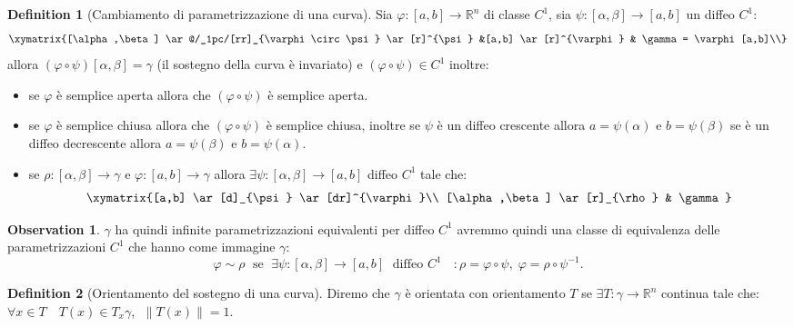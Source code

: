 \documentclass[leqno]{article}
\theoremstyle{definition}
\newtheorem{definition}{Definition}[section]
\numberwithin{equation}{section}
\newtheorem{observation}[theorem]{Observation}
\theoremstyle{remark}
\begin{document}
	\begin{definition}[Cambiamento di parametrizzazione di una curva]
		Sia $\varphi: [a,b] \to \mathbb{R}^n$ di classe $C^1$, sia $\psi : [\alpha,\beta] \to [a,b]$ un diffeo $C^1$:
		\begin{equation}
			\xymatrix{[\alpha,\beta] \ar@/_1pc/[rr]_{\varphi \circ \psi} 
				\ar[r]^{\psi}  &[a,b] \ar[r]^{\varphi} & \gamma = \varphi [a,b]\\}
		\end{equation}
		allora $(\varphi \circ \psi) [\alpha, \beta] = \gamma$ (il sostegno della curva è invariato) e $(\varphi \circ \psi) \in C^1$ inoltre:
		\begin{itemize}
			\item se $\varphi$ è semplice aperta allora che $(\varphi \circ \psi)$ è semplice aperta. 
			\item se $\varphi$ è semplice chiusa allora che $(\varphi \circ \psi)$ è semplice chiusa, inoltre se $\psi$ è un diffeo crescente allora $a=\psi(\alpha)$ e $b=\psi(\beta)$ se è un diffeo decrescente allora $a=\psi(\beta)$ e $b=\psi(\alpha)$.
			\item se $\rho : [\alpha,\beta]\to \gamma$ e $\varphi : [a,b] \to \gamma$ allora $\exists \psi : [\alpha, \beta] \to [a,b]$ diffeo $C^1$ tale che:\begin{equation}
				\xymatrix{[a,b] \ar[d]_{\psi} \ar[dr]^{\varphi}\\
					[\alpha,\beta] \ar[r]_{\rho} & \gamma}
			\end{equation}
		\end{itemize}
		\begin{observation}
			$\gamma$ ha quindi infinite parametrizzazioni equivalenti per diffeo $C^1$ avremmo quindi una classe di equivalenza delle parametrizzazioni $C^1$ che hanno come immagine $\gamma$:
			\begin{equation}
				\varphi \sim \rho \; \text{ se } \; \exists \psi : [\alpha,\beta] \to [a,b] \; \text{ diffeo $C^1$ } \; : \rho = \varphi \circ \psi, \; \varphi = \rho \circ \psi^{-1}.
			\end{equation}
		\end{observation}
	\end{definition}
	
	\begin{definition}[Orientamento del sostegno di una curva]
		Diremo che $\gamma$ è orientata con orientamento $T$ se $\exists T : \gamma \to \mathbb{R}^n$ continua tale che: $\forall x \in T \quad T(x)\in T_x\gamma$, $\;\lVert T(x) \rVert =1.$
	\end{definition}
	
\end{document}
